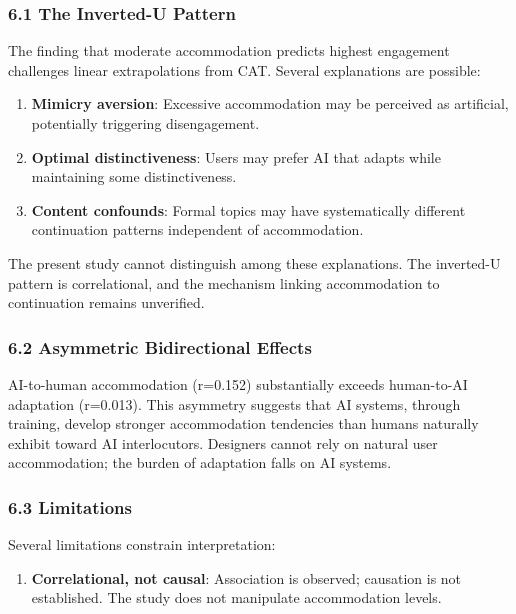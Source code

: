 
\subsubsection{6.1 The Inverted-U Pattern}

The finding that moderate accommodation predicts highest engagement challenges linear extrapolations from CAT. Several explanations are possible:

\begin{enumerate}
\item \textbf{Mimicry aversion}: Excessive accommodation may be perceived as artificial, potentially triggering disengagement.
\item \textbf{Optimal distinctiveness}: Users may prefer AI that adapts while maintaining some distinctiveness.
\item \textbf{Content confounds}: Formal topics may have systematically different continuation patterns independent of accommodation.
\end{enumerate}

The present study cannot distinguish among these explanations. The inverted-U pattern is correlational, and the mechanism linking accommodation to continuation remains unverified.

\subsubsection{6.2 Asymmetric Bidirectional Effects}

AI-to-human accommodation (r=0.152) substantially exceeds human-to-AI adaptation (r=0.013). This asymmetry suggests that AI systems, through training, develop stronger accommodation tendencies than humans naturally exhibit toward AI interlocutors. Designers cannot rely on natural user accommodation; the burden of adaptation falls on AI systems.

\subsubsection{6.3 Limitations}

Several limitations constrain interpretation:

\begin{enumerate}
\item \textbf{Correlational, not causal}: Association is observed; causation is not established. The study does not manipulate accommodation levels.
\end{enumerate}


